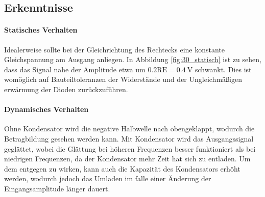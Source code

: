 \subsection{Erkenntnisse}

\paragraph{Statisches Verhalten} Idealerweise sollte bei der Gleichrichtung des Rechtecks eine konstante Gleichspannung am Ausgang anliegen. In Abbildung \ref{fig:30_statisch} ist zu sehen, dass das Signal nahe der Amplitude etwa um $0.2 \mathrm{RE} = \SI{0.4}{\volt}$ schwankt. Dies ist womöglich auf Bauteiltoleranzen der Widerstände und der Ungleichmäßigen erwärmung der Dioden zurückzuführen.

\paragraph{Dynamisches Verhalten} Ohne Kondensator wird die negative Halbwelle nach obengeklappt, wodurch die Betragbildung gesehen werden kann. Mit Kondensator wird das Ausgangssignal geglättet, wobei die Glättung bei höheren Frequenzen besser funktioniert als bei niedrigen Frequenzen, da der Kondensator mehr Zeit hat sich zu entladen. Um dem entgegen zu wirken, kann auch die Kapazität des Kondensators erhöht werden, wodurch jedoch das Umladen im falle einer Änderung der Eingangsamplitude länger dauert.